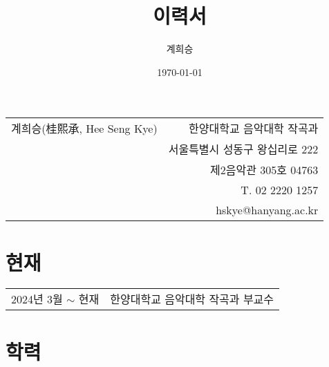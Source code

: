 \documentclass[a4paper,10pt,draft]{article}
\title{이력서}
\author{계희승}
\date{\today}
\begin{document}
  \renewcommand{\headrulewidth}{0pt}
  \fancyhf{}
  \fancyfoot[RE,RO]{\small \thepage}
  
  \hspace*{-0.8cm}
  \begin{tabular}{p{9.21cm} r}
    {\large 계희승(桂熙承, Hee Seng Kye)} & 한양대학교 음악대학 작곡과\\
    & 서울특별시 성동구 왕십리로 222\\
    & 제2음악관 305호 04763\\
    & T. 02 2220 1257\\
    & hskye@hanyang.ac.kr
  \end{tabular}
  
  \vspace{15mm}
  
  \section*{\normalsize 현재}
  
  \hspace*{-0.25cm}
  \begin{tabular}{p{4.0cm} l}
    2024년 3월 $\sim$ 현재 & 한양대학교 음악대학 작곡과 부교수
  \end{tabular}
  
  \vspace*{2.5mm}
  
  \section*{\normalsize 학력}
  
\end{document}
